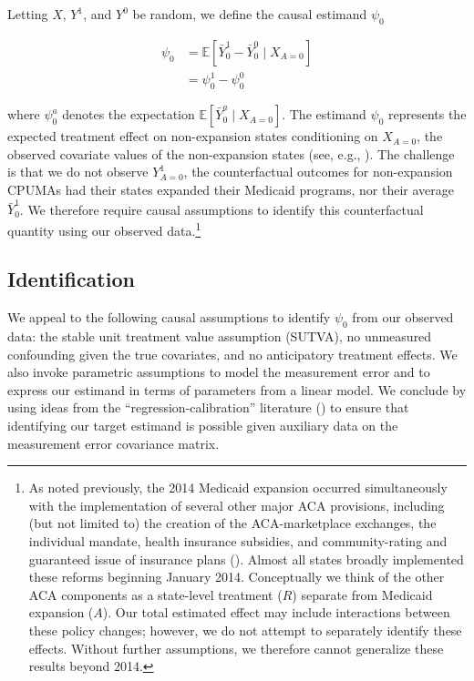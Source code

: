 \documentclass[aoas]{imsart}
\theoremstyle{plain}
\theoremstyle{remark}
\begin{document}
Letting $X$, $Y^1$, and $Y^0$ be random, we define the causal estimand $\psi_0$

\begin{align} \label{eqn:psi}
    \psi_0&= \mathbb{E}[\bar{Y}_0^1 - \bar{Y}_0^0 \mid X_{A=0}] \\ 
    &= \psi_0^1 - \psi_0^0
\end{align}

where $\psi_0^a$ denotes the expectation $\mathbb{E}[\bar{Y}_0^a \mid X_{A=0}]$. The estimand $\psi_0$ represents the expected treatment effect on non-expansion states conditioning on $X_{A=0}$, the observed covariate values of the non-expansion states (see, e.g., \cite{imbens2004nonparametric}). The challenge is that we do not observe $Y^1_{A=0}$, the counterfactual outcomes for non-expansion CPUMAs had their states expanded their Medicaid programs, nor their average $\bar{Y}^1_0$. We therefore require causal assumptions to identify this counterfactual quantity using our observed data.\footnote{As noted previously, the 2014 Medicaid expansion occurred simultaneously with the implementation of several other major ACA provisions, including (but not limited to) the creation of the ACA-marketplace exchanges, the individual mandate, health insurance subsidies, and community-rating and guaranteed issue of insurance plans (\cite{courtemanche2017early}). Almost all states broadly implemented these reforms beginning January 2014. Conceptually we think of the other ACA components as a state-level treatment ($R$) separate from Medicaid expansion ($A$). Our total estimated effect may include interactions between these policy changes; however, we do not attempt to separately identify these effects. Without further assumptions, we therefore cannot generalize these results beyond 2014.} 

\subsection{Identification} \label{ssec:identification}

We appeal to the following causal assumptions to identify $\psi_0$ from our observed data: the stable unit treatment value assumption (SUTVA), no unmeasured confounding given the true covariates, and no anticipatory treatment effects. We also invoke parametric assumptions to model the measurement error and to express our estimand in terms of parameters from a linear model. We conclude by using ideas from the ``regression-calibration'' literature (\cite{gleser1992importance}) to ensure that identifying our target estimand is possible given auxiliary data on the measurement error covariance matrix.
\end{document}

